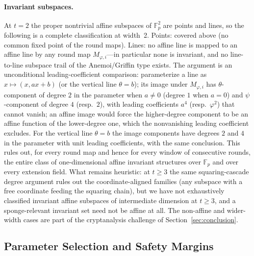 \documentclass[11pt,a4paper]{article}
\theoremstyle{definition}
\newcommand{\Fp}{\mathbb{F}_p}
\begin{document}
\paragraph{Invariant subspaces.}
At $t = 2$ the proper nontrivial affine subspaces of $\Fp^2$ are
points and lines, so the following is a complete classification at
width~2. Points: covered above (no common fixed point of the round
maps). Lines: no affine line is mapped to an affine line by any
round map $M_{\varphi,i}$---in particular none is invariant, and no
line-to-line subspace trail of the Anemoi/Griffin type exists. The
argument is an unconditional leading-coefficient comparison:
parameterize a line as $x \mapsto (x, ax+b)$ (or the vertical line
$\theta = b$); its image under $M_{\varphi,i}$ has
$\theta$-component of degree $2$ in the parameter when $a \ne 0$
(degree $1$ when $a = 0$) and $\psi$-component of degree $4$ (resp.\
$2$), with leading coefficients $a^4$ (resp.\ $\varphi^2$) that
cannot vanish; an affine image would force the higher-degree
component to be an affine function of the lower-degree one, which the
nonvanishing leading coefficient excludes. For the vertical line
$\theta = b$ the image components have degrees $2$ and $4$ in the
parameter with unit leading coefficients, with the same conclusion. This rules out, for every round map and hence for
every window of consecutive rounds, the entire class of
one-dimensional affine invariant structures over $\Fp$ and over
every extension field. What remains heuristic: at $t \ge 3$ the same
squaring-cascade degree argument rules out the coordinate-aligned
families (any subspace with a free coordinate feeding the squaring
chain), but we have not exhaustively classified invariant affine
subspaces of intermediate dimension at $t \ge 3$, and a
sponge-relevant invariant set need not be affine at all. The
non-affine and wider-width cases are part of the cryptanalysis
challenge of Section~\ref{sec:conclusion}.

\FloatBarrier


\subsection{Parameter Selection and Safety Margins}\label{sec:security:parameters}
\end{document}
